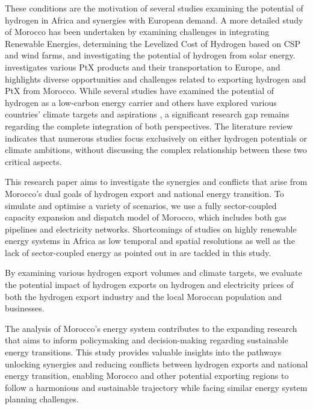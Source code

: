 These conditions are the motivation of several studies \cite{vanWijk2021, AbouSeada2022, vanderZwaan2021, Schellekens2010, Cavana2021, Touili2022, Timmerberg2019a, Sens2022} examining the potential of hydrogen in Africa and synergies with European demand. A more detailed study of Morocco has been undertaken by \cite{Boulakhbar2020} examining challenges in integrating Renewable Energies, \cite{Khouya2020} determining the Levelized Cost of Hydrogen based on CSP and wind farms, and \cite{Touili2018} investigating the potential of hydrogen from solar energy. \cite{Hampp2021} investigates various PtX products and their transportation to Europe, and \cite{Eichhammer2019} highlights diverse opportunities and challenges related to exporting hydrogen and PtX from Morocco. While several studies\cite{Hampp2021, AbouSeada2022, vanWijk2021} have examined the potential of hydrogen as a low-carbon energy carrier and others have explored various countries' climate targets and aspirations \cite{Boulakhbar2020}, a significant research gap remains regarding the complete integration of both perspectives. The literature review indicates that numerous studies focus exclusively on either hydrogen potentials or climate ambitions, without discussing the complex relationship between these two critical aspects.

This research paper aims to investigate the synergies and conflicts that arise from Morocco's dual goals of hydrogen export and national energy transition. To simulate and optimise a variety of scenarios, we use a fully sector-coupled capacity expansion and dispatch model of Morocco, which includes both gas pipelines and electricity networks.
Shortcomings of studies on highly renewable energy systems in Africa as low temporal and spatial resolutions as well as the lack of sector-coupled energy as pointed out in \cite{Oyewo2023} are tackled in this study.

By examining various hydrogen export volumes and climate targets, we evaluate the potential impact of hydrogen exports on hydrogen and electricity prices of both the hydrogen export industry and the local Moroccan population and businesses.

The analysis of Morocco's energy system contributes to the expanding research that aims to inform policymaking and decision-making regarding sustainable energy transitions. This study provides valuable insights into the pathways unlocking synergies and reducing conflicts between hydrogen exports and national energy transition, enabling Morocco and other potential exporting regions to follow a harmonious and sustainable trajectory while facing similar energy system planning challenges.



